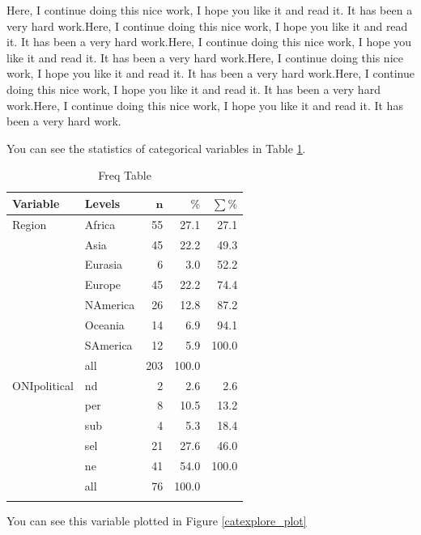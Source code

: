 \documentclass[11pt]{article}
\begin{document}
Here, I continue doing this nice work, I hope you like it and read it. It has been a very hard work.Here, I continue doing this nice work, I hope you like it and read it. It has been a very hard work.Here, I continue doing this nice work, I hope you like it and read it. It has been a very hard work.Here, I continue doing this nice work, I hope you like it and read it. It has been a very hard work.Here, I continue doing this nice work, I hope you like it and read it. It has been a very hard work.Here, I continue doing this nice work, I hope you like it and read it. It has been a very hard work.

You can see the statistics of categorical variables in Table \ref{catexplore_table}.

\begingroup\normalsize
\begin{longtable}{llrrr}
\caption{Freq Table} \\ 
 \textbf{Variable} & \textbf{Levels} & $\mathbf{n}$ & $\mathbf{\%}$ & $\mathbf{\sum \%}$ \\ 
  \hline
Region & Africa & 55 & 27.1 & 27.1 \\ 
   & Asia & 45 & 22.2 & 49.3 \\ 
   & Eurasia & 6 & 3.0 & 52.2 \\ 
   & Europe & 45 & 22.2 & 74.4 \\ 
   & NAmerica & 26 & 12.8 & 87.2 \\ 
   & Oceania & 14 & 6.9 & 94.1 \\ 
   & SAmerica & 12 & 5.9 & 100.0 \\ 
   \hline
 & all & 203 & 100.0 &  \\ 
   \hline
\hline
ONIpolitical & nd & 2 & 2.6 & 2.6 \\ 
   & per & 8 & 10.5 & 13.2 \\ 
   & sub & 4 & 5.3 & 18.4 \\ 
   & sel & 21 & 27.6 & 46.0 \\ 
   & ne & 41 & 54.0 & 100.0 \\ 
   \hline
 & all & 76 & 100.0 &  \\ 
   \hline
\hline
\hline
\label{catexplore_table}
\end{longtable}
\endgroup





You can see this variable plotted in Figure \ref{catexplore_plot}
\end{document}
